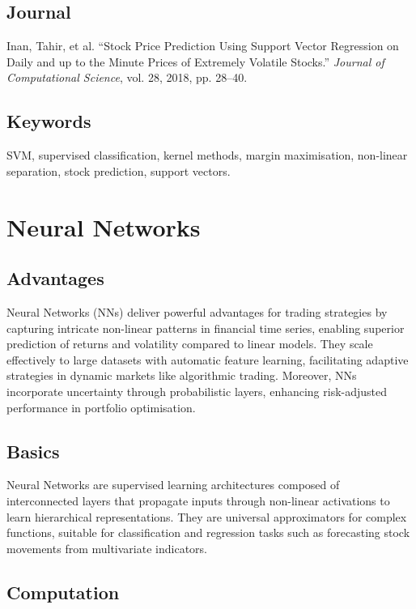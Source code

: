 \documentclass{article}
\begin{document}
\subsection{Journal}

Inan, Tahir, et al. ``Stock Price Prediction Using Support Vector Regression on Daily and up to the Minute Prices of Extremely Volatile Stocks.'' \textit{Journal of Computational Science}, vol. 28, 2018, pp. 28--40.

\subsection{Keywords}

SVM, supervised classification, kernel methods, margin maximisation, non-linear separation, stock prediction, support vectors.


\section{Neural Networks}

\subsection{Advantages}

Neural Networks (NNs) deliver powerful advantages for trading strategies by capturing intricate non-linear patterns in financial time series, enabling superior prediction of returns and volatility compared to linear models. They scale effectively to large datasets with automatic feature learning, facilitating adaptive strategies in dynamic markets like algorithmic trading. Moreover, NNs incorporate uncertainty through probabilistic layers, enhancing risk-adjusted performance in portfolio optimisation.

\subsection{Basics}

Neural Networks are supervised learning architectures composed of interconnected layers that propagate inputs through non-linear activations to learn hierarchical representations. They are universal approximators for complex functions, suitable for classification and regression tasks such as forecasting stock movements from multivariate indicators.

\subsection{Computation}
\end{document}
